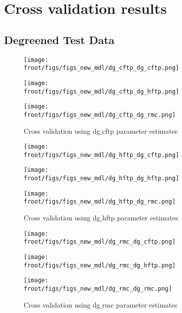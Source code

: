 \newpage
\section{Cross validation results}

\subsection{Degreened Test Data}

\begin{figure}[H]
        \begin{minipage}{0.33\textwidth}
                \texttt{[image: \\froot/figs/figs\_new\_mdl/dg\_cftp\_dg\_cftp.png]}
        \end{minipage}
        \begin{minipage}{0.33\textwidth}
                \texttt{[image: \\froot/figs/figs\_new\_mdl/dg\_cftp\_dg\_hftp.png]}
        \end{minipage}
        \begin{minipage}{0.33\textwidth}
                \texttt{[image: \\froot/figs/figs\_new\_mdl/dg\_cftp\_dg\_rmc.png]}
        \end{minipage}
        \caption{Cross validation using dg$\_$cftp parameter estimates}
\end{figure}

\begin{figure}[H]
        \begin{minipage}{0.33\textwidth}
                \texttt{[image: \\froot/figs/figs\_new\_mdl/dg\_hftp\_dg\_cftp.png]}
        \end{minipage}
        \begin{minipage}{0.33\textwidth}
                \texttt{[image: \\froot/figs/figs\_new\_mdl/dg\_hftp\_dg\_hftp.png]}
        \end{minipage}
        \begin{minipage}{0.33\textwidth}
                \texttt{[image: \\froot/figs/figs\_new\_mdl/dg\_hftp\_dg\_rmc.png]}
        \end{minipage}
        \caption{Cross validation using dg$\_$hftp parameter estimates}
\end{figure}

\begin{figure}[H]
        \begin{minipage}{0.33\textwidth}
                \texttt{[image: \\froot/figs/figs\_new\_mdl/dg\_rmc\_dg\_cftp.png]}
        \end{minipage}
        \begin{minipage}{0.33\textwidth}
                \texttt{[image: \\froot/figs/figs\_new\_mdl/dg\_rmc\_dg\_hftp.png]}
        \end{minipage}
        \begin{minipage}{0.33\textwidth}
                \texttt{[image: \\froot/figs/figs\_new\_mdl/dg\_rmc\_dg\_rmc.png]}
        \end{minipage}
        \caption{Cross validation using dg$\_$rmc parameter estimates}
\end{figure}


